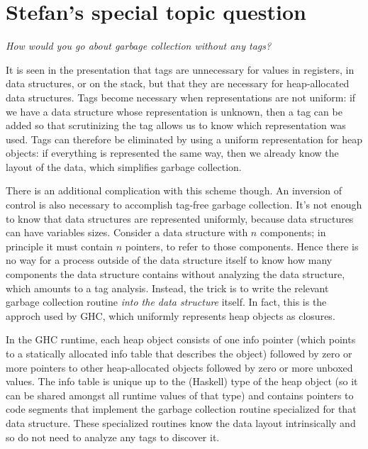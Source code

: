 \documentclass[letterpaper,11pt]{article}
\begin{document}
\section{Stefan's special topic question}

\begin{displayquote}
  \emph{How would you go about garbage collection without any tags?}
\end{displayquote}

It is seen in the presentation that tags are unnecessary for values in
registers, in data structures, or on the stack, but that they are necessary for
heap-allocated data structures. Tags become necessary when representations are
not uniform: if we have a data structure whose representation is unknown, then
a tag can be added so that scrutinizing the tag allows us to know which
representation was used. Tags can therefore be eliminated by using a uniform
representation for heap objects: if everything is represented the same way,
then we already know the layout of the data, which simplifies garbage
collection.

There is an additional complication with this scheme though. An inversion of
control is also necessary to accomplish tag-free garbage collection. It's not
enough to know that data structures are represented uniformly, because data
structures can have variables sizes. Consider a data structure with $n$
components; in principle it must contain $n$ pointers, to refer to those
components. Hence there is no way for a process outside of the data structure
itself to know how many components the data structure contains without
analyzing the data structure, which amounts to a tag analysis. Instead, the
trick is to write the relevant garbage collection routine \emph{into the data
structure} itself. In fact, this is the approch used by GHC, which uniformly
represents heap objects as closures.

In the GHC runtime, each heap object consists of one info pointer (which points
to a statically allocated info table that describes the object) followed by
zero or more pointers to other heap-allocated objects followed by zero or more
unboxed values\footnotemark. The info table is unique up to the (Haskell) type
of the heap object (so it can be shared amongst all runtime values of that
type) and contains pointers to code segments that implement the garbage
collection routine specialized for that data structure. These specialized
routines know the data layout intrinsically and so do not need to analyze any
tags to discover it.
\end{document}
